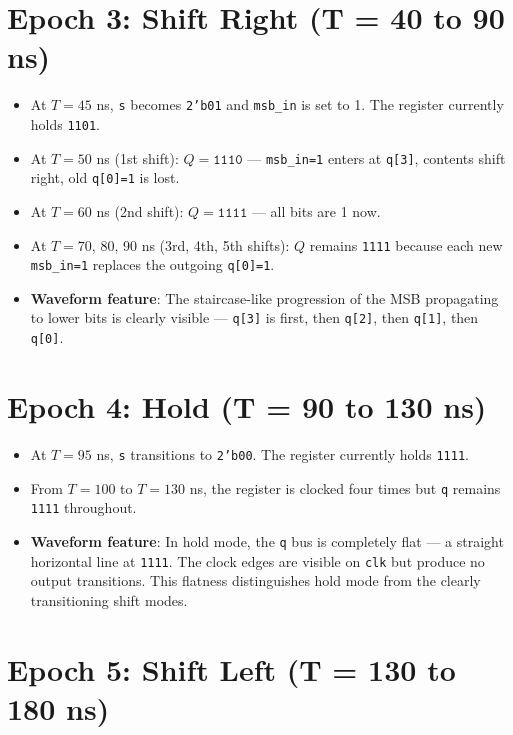 \documentclass[12pt,a4paper]{report}
\newcommand{\signal}[1]{\texttt{\textcolor{codeblue}{#1}}}
\begin{document}
\section{Epoch 3: Shift Right (T = 40 to 90 ns)}

\begin{itemize}
    \item At $T = 45$ ns, \signal{s} becomes \texttt{2'b01} and \signal{msb\_in} is set to 1. The register currently holds \texttt{1101}.
    \item At $T = 50$ ns (1st shift): $Q = \texttt{1110}$ — \texttt{msb\_in=1} enters at \signal{q[3]}, contents shift right, old \signal{q[0]=1} is lost.
    \item At $T = 60$ ns (2nd shift): $Q = \texttt{1111}$ — all bits are 1 now.
    \item At $T = 70$, 80, 90 ns (3rd, 4th, 5th shifts): $Q$ remains \texttt{1111} because each new \texttt{msb\_in=1} replaces the outgoing \signal{q[0]=1}.
    \item \textbf{Waveform feature}: The staircase-like progression of the MSB propagating to lower bits is clearly visible — \signal{q[3]} is first, then \signal{q[2]}, then \signal{q[1]}, then \signal{q[0]}.
\end{itemize}

\section{Epoch 4: Hold (T = 90 to 130 ns)}

\begin{itemize}
    \item At $T = 95$ ns, \signal{s} transitions to \texttt{2'b00}. The register currently holds \texttt{1111}.
    \item From $T = 100$ to $T = 130$ ns, the register is clocked four times but \signal{q} remains \texttt{1111} throughout.
    \item \textbf{Waveform feature}: In hold mode, the \signal{q} bus is completely flat — a straight horizontal line at \texttt{1111}. The clock edges are visible on \signal{clk} but produce no output transitions. This flatness distinguishes hold mode from the clearly transitioning shift modes.
\end{itemize}

\section{Epoch 5: Shift Left (T = 130 to 180 ns)}
\end{document}
